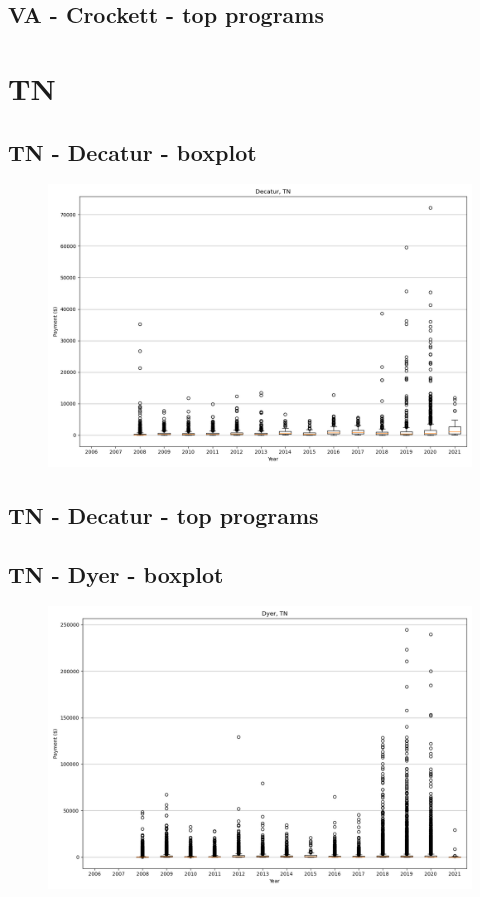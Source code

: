 \subsection*{VA - Crockett - top programs}

\newpage
\section*{TN}
\subsection*{TN - Decatur - boxplot}
\begin{figure}[h]
\centering
\includegraphics[width=7in]{../output/boxplots/counties/Decatur-TN_boxplot.png}
\end{figure}


\subsection*{TN - Decatur - top programs}

\newpage
\subsection*{TN - Dyer - boxplot}
\begin{figure}[h]
\centering
\includegraphics[width=7in]{../output/boxplots/counties/Dyer-TN_boxplot.png}
\end{figure}



